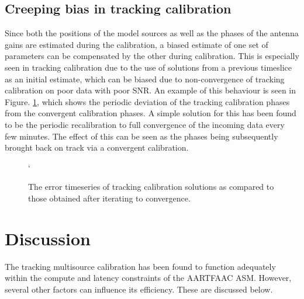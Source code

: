 \documentclass{aa}
\begin{document}
\subsection{Creeping bias in tracking calibration}

Since both the positions of the model sources as well as the phases
of the antenna gains are estimated during the calibration, a biased
estimate of one set of parameters can be compensated by the other
during calibration. This is especially seen in tracking calibration
due to the use of solutions from a previous timeslice as an initial
estimate, which can be biased due to non-convergence of tracking calibration
on poor data with poor SNR. An example of this behaviour is seen in
Figure. \ref{fig:The-error-timeseries-1}, which shows the periodic
deviation of the tracking calibration phases from the convergent calibration
phases. A simple solution for this has been found to be the periodic
recalibration to full convergence of the incoming data every few minutes.
The effect of this can be seen as the phases being subsequently brought
back on track via a convergent calibration.

\begin{figure}[tbh]
`\caption{\label{fig:The-error-timeseries-1}The error timeseries of tracking
calibration solutions as compared to those obtained after iterating
to convergence. }
\end{figure}


\section{\label{sec:Discussion}Discussion}

The tracking multisource calibration has been found to function adequately
within the compute and latency constraints of the AARTFAAC ASM. However,
several other factors can influence its efficiency. These are discussed
below.
\end{document}
